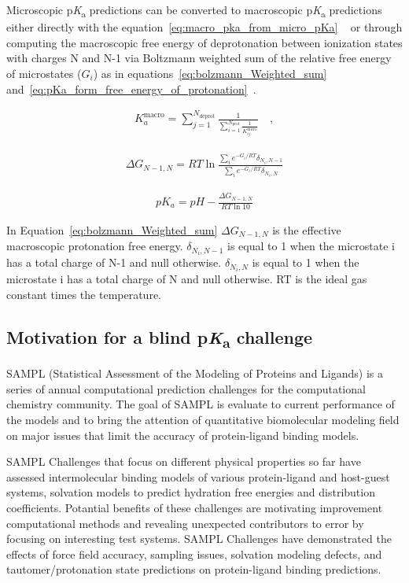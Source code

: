 \documentclass[9pt,lineno,final]{elife}
\newcommand{\pKa}{p\textit{K}\textsubscript{a}}
\begin{document}
Microscopic \pKa{} predictions can be converted to macroscopic \pKa{} predictions either directly with the equation~\ref{eq:macro_pka_from_micro_pKa} ~\citep{Bochevarov:2016:J.Chem.TheoryComput.a} or through computing the macroscopic free energy of deprotonation between ionization states with charges N and N-1 via Boltzmann weighted sum of the relative free energy of microstates ($G_i$) as in equations~\ref{eq:bolzmann_Weighted_sum} and~\ref{eq:pKa_form_free_energy_of_protonation}~\citep{Selwa:2018:J.Comput.AidedMol.Des.}.

\begin{align}
 K_a^\text{macro} = \sum_{j=1}^{N_\text{deprot}} \frac{1}{\sum_{i=1}^{N_\text{prot}}\frac{1}{ K_{ij}^\text{micro}}} \quad, \label{eq:macro_pka_from_micro_pKa}
\end{align}

\begin{align}
  \Delta G_{N-1, N} = RT \ln{\frac{\sum_i e^{-G_i/RT} \delta _{N_i, N-1}}{\sum_i e^{-G_i/RT} \delta _{N_i, N}}}
  \label{eq:bolzmann_Weighted_sum}
\end{align}

\begin{align}
  pK_a = pH - \frac{\Delta G_{N-1, N}}{RT \ln{10}}
  \label{eq:pKa_form_free_energy_of_protonation}
\end{align}

In Equation~\ref{eq:bolzmann_Weighted_sum} $\Delta G_{N-1, N}$ is the effective macroscopic
protonation free energy.  $\delta _{N_i, N-1}$ is equal to 1 when the microstate i has a total charge of N-1 and null otherwise. 
$\delta _{N_i, N}$ is equal to 1 when the microstate i has a total charge of N and null otherwise. RT is the ideal gas constant times the temperature.


\subsection{Motivation for a blind \pKa{} challenge}

SAMPL (Statistical Assessment of the Modeling of Proteins and Ligands) is a series of annual computational prediction challenges for the computational chemistry community. The goal of SAMPL is evaluate to current performance of the models and to bring the attention of quantitative biomolecular modeling field on major issues that limit the accuracy of protein-ligand binding models.

SAMPL Challenges that focus on different physical properties so far have assessed intermolecular binding models of various protein-ligand and host-guest systems, solvation models to predict hydration free energies and distribution coefficients. 
Potantial benefits of these challenges are motivating improvement computational methods and revealing unexpected contributors to error by focusing on interesting test systems. 
SAMPL Challenges have demonstrated the effects of force field accuracy, sampling issues, solvation modeling defects, and tautomer/protonation state predictions on protein-ligand binding predictions.  
\end{document}
